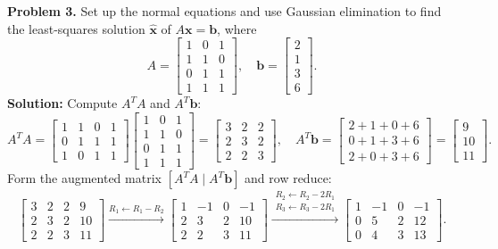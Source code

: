 \documentclass[11pt, letterpaper]{article}
\theoremstyle{definition}
\theoremstyle{remark}
\begin{document}
\textbf{Problem 3.} Set up the normal equations and use Gaussian elimination to find the least-squares solution $\hat{\mathbf{x}}$ of $A\mathbf{x} = \mathbf{b}$, where
\[
A = \begin{bmatrix} 1 & 0 & 1 \\ 1 & 1 & 0 \\ 0 & 1 & 1 \\ 1 & 1 & 1 \end{bmatrix}, \quad \mathbf{b} = \begin{bmatrix} 2 \\ 1 \\ 3 \\ 6 \end{bmatrix}.
\]
\textbf{Solution:} Compute $A^T A$ and $A^T \mathbf{b}$:
\[
A^T A = \begin{bmatrix} 1 & 1 & 0 & 1 \\ 0 & 1 & 1 & 1 \\ 1 & 0 & 1 & 1 \end{bmatrix} \begin{bmatrix} 1 & 0 & 1 \\ 1 & 1 & 0 \\ 0 & 1 & 1 \\ 1 & 1 & 1 \end{bmatrix} = \begin{bmatrix} 3 & 2 & 2 \\ 2 & 3 & 2 \\ 2 & 2 & 3 \end{bmatrix}, \quad A^T \mathbf{b} = \begin{bmatrix} 2+1+0+6 \\ 0+1+3+6 \\ 2+0+3+6 \end{bmatrix} = \begin{bmatrix} 9 \\ 10 \\ 11 \end{bmatrix}.
\]
Form the augmented matrix $[A^T A \mid A^T \mathbf{b}]$ and row reduce:
\[
\left[\begin{array}{ccc|c} 3 & 2 & 2 & 9 \\ 2 & 3 & 2 & 10 \\ 2 & 2 & 3 & 11 \end{array}\right] \xrightarrow{R_1 \leftarrow R_1 - R_2} \left[\begin{array}{ccc|c} 1 & -1 & 0 & -1 \\ 2 & 3 & 2 & 10 \\ 2 & 2 & 3 & 11 \end{array}\right] \xrightarrow{\substack{R_2 \leftarrow R_2 - 2R_1 \\ R_3 \leftarrow R_3 - 2R_1}} \left[\begin{array}{ccc|c} 1 & -1 & 0 & -1 \\ 0 & 5 & 2 & 12 \\ 0 & 4 & 3 & 13 \end{array}\right].
\]
\end{document}
